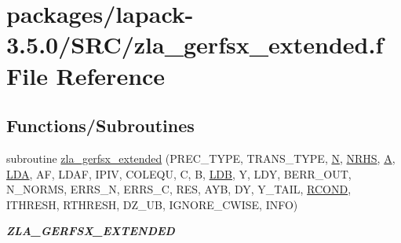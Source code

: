 \hypertarget{zla__gerfsx__extended_8f}{}\section{packages/lapack-\/3.5.0/\+S\+R\+C/zla\+\_\+gerfsx\+\_\+extended.f File Reference}
\label{zla__gerfsx__extended_8f}
\subsection*{Functions/\+Subroutines}
\begin{DoxyCompactItemize}
\item 
subroutine \hyperlink{group__complex16GEcomputational_gaf04f5fc86ce0bcd42d8eed61cf927692}{zla\+\_\+gerfsx\+\_\+extended} (P\+R\+E\+C\+\_\+\+T\+Y\+P\+E, T\+R\+A\+N\+S\+\_\+\+T\+Y\+P\+E, \hyperlink{polmisc_8c_a0240ac851181b84ac374872dc5434ee4}{N}, \hyperlink{example__user_8c_aa0138da002ce2a90360df2f521eb3198}{N\+R\+H\+S}, \hyperlink{classA}{A}, \hyperlink{example__user_8c_ae946da542ce0db94dced19b2ecefd1aa}{L\+D\+A}, A\+F, L\+D\+A\+F, I\+P\+I\+V, C\+O\+L\+E\+Q\+U, C, B, \hyperlink{example__user_8c_a50e90a7104df172b5a89a06c47fcca04}{L\+D\+B}, Y, L\+D\+Y, B\+E\+R\+R\+\_\+\+O\+U\+T, N\+\_\+\+N\+O\+R\+M\+S, E\+R\+R\+S\+\_\+\+N, E\+R\+R\+S\+\_\+\+C, R\+E\+S, A\+Y\+B, D\+Y, Y\+\_\+\+T\+A\+I\+L, \hyperlink{superlu__enum__consts_8h_af00a42ecad444bbda75cde1b64bd7e72a9b5c151728d8512307565994c89919d5}{R\+C\+O\+N\+D}, I\+T\+H\+R\+E\+S\+H, R\+T\+H\+R\+E\+S\+H, D\+Z\+\_\+\+U\+B, I\+G\+N\+O\+R\+E\+\_\+\+C\+W\+I\+S\+E, I\+N\+F\+O)
\begin{DoxyCompactList}\small\item\em {\bfseries Z\+L\+A\+\_\+\+G\+E\+R\+F\+S\+X\+\_\+\+E\+X\+T\+E\+N\+D\+E\+D} \end{DoxyCompactList}\end{DoxyCompactItemize}
